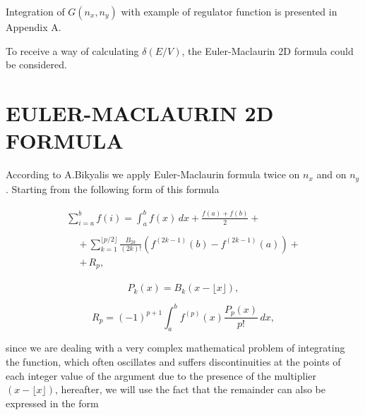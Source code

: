 \documentclass[twoside, 10pt, ptm]{article}
\begin{document}
\begin{multicols}{2}
Integration of \(G\left(n_x, n_y\right)\) with example of regulator
function is presented in Appendix A.

    To receive a way of calculating \(\delta\left(E/V\right)\), the Euler-Maclaurin 2D formula
could be considered.


\section*{\centering\uppercase{Euler-Maclaurin 2D formula}}\label{eulermaclaurin-2d-formula}
\vspace{-3.5mm}


According to A.Bikyalis \cite{Bikyalis1968} we apply Euler-Maclaurin
formula twice on \(n_x\) and on \(n_y\). Starting from the following form of this formula


    \begin{equation} \label{eq:7}
\begin{array}{l}
\begin{array}{ll}
\displaystyle \sum _{i=a}^{b}f(i)= \int_{a}^{b}f(x)\,dx+{\frac {f(a)+f(b)}{2}} + & \,\,\,\,
\end{array}  \\
\begin{array}{rr}
\,\,\, & +\,\sum_{k=1}^{\lfloor p/2\rfloor }{\frac {B_{2k}}{(2k)!}}\left(f^{(2k-1)}(b)-f^{(2k-1)}(a)\right)+ \\
\,\,\, & + \,R_{p},
\end{array}
\end{array}\end{equation}

\begin{equation} \label{eq:8}
{\displaystyle P_{k}(x)=B_{k}\left(x-\lfloor x\rfloor \right),}
\end{equation}

\begin{equation} \label{eq:9}
{\displaystyle R_{p}=(-1)^{p+1}\int_{a}^{b}f^{(p)}(x){\frac {P_{p}(x)}{p!}}\,dx},
\end{equation}

since we are dealing with a very complex mathematical
problem of integrating the function, which often oscillates and
suffers discontinuities at the points of each integer value of the
argument due to the presence of the multiplier \((x-\lfloor x\rfloor )\), hereafter,
we will use the fact that the remainder can also
be expressed in the form


\end{multicols}
\end{document}
